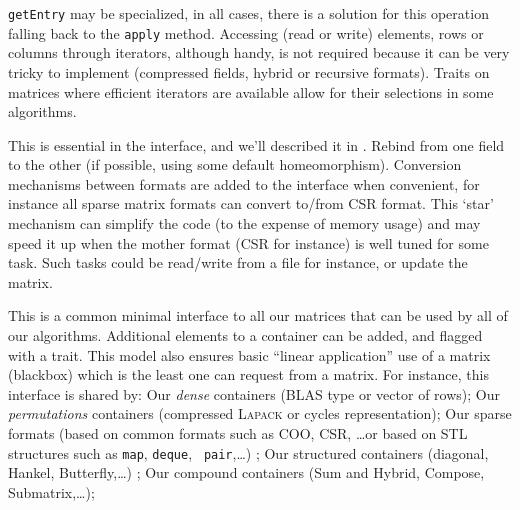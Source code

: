 		\texttt{getEntry} may be specialized, in all cases, there is a
		solution for this operation falling back to the {\tt apply}
		method.
		Accessing (read or write) elements, rows or columns through
		iterators, although handy, is not required because it can be
		very tricky to implement (compressed fields, hybrid or
		recursive formats). Traits on matrices where efficient iterators
		are available allow for their selections in some algorithms.
		\begin{comment}
		(\danger We cannot have {\tt const} iterators for all formats
		(see hybrid), walking through a matrix in unspecified order can
		be problematic, for instance, in an hom when a zero may
		alter/change the representation. I don't understand hom more
		than I understand init/rebind by the way, and I won't
		understand it until the morphism is given/chooseable/enforced.
		Rebind is really hom, so why is it in the interface anyway?
		This is the same with getEntry. We don't require it because we
		have a solution. Also, if apply is to be implemented via a
		domain or {\tt mul}, we could stress it is in the interface for
		convenience when writing code only. End of \danger)
		\end{comment}
%
		This is essential in the \applin interface, and we'll described
		it in .
%
		Rebind from one field to the other (if
		possible, using some default homeomorphism).
%
	 Conversion mechanisms between formats are added to the interface when
	 convenient, for instance all sparse matrix formats can convert to/from
	 CSR format.  This `star' mechanism can simplify the code (to the
	 expense of memory usage) and may speed it up when the mother format
	 (CSR for instance) is well tuned for some task. Such tasks could be
	 read/write from a file for instance, or update the matrix.
%
	 \par
%
This is a common minimal interface to all our matrices that can be used by all
of our algorithms. Additional elements to a container can be added, and flagged
with a trait. This model also ensures basic ``linear application'' use of a
matrix (blackbox) which is the least one can request from a matrix.  For
instance, this interface is shared by: Our \emph{dense} containers (BLAS type or
vector of rows); Our  \emph{permutations} containers (compressed \textsc{Lapack} or
cycles representation); Our sparse formats (based on common formats such as
COO, CSR, \ldots or based on STL structures such as {\tt map}, {\tt deque}, {\tt
pair},\ldots) ; Our structured containers (diagonal, Hankel, Butterfly,\ldots) ;
Our compound containers (Sum and Hybrid, Compose, Submatrix,\ldots);
%
